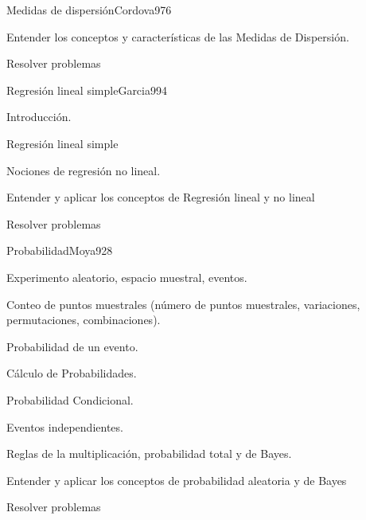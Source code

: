 \begin{sumilla}
\begin{unit}{Medidas de dispersi\'on}{Cordova97}{6}
   \begin{objetivos}
         \item  Entender los conceptos y caracter\'isticas de las Medidas de Dispersi\'on.
         \item  Resolver problemas
   \end{objetivos}
\end{unit}

\begin{unit}{Regresi\'on lineal simple}{Garcia99}{4}
   \begin{topicos}
         \item  Introducci\'on.
	 \item  Regresi\'on lineal simple
         \item  Nociones de regresi\'on no lineal.
   \end{topicos}

   \begin{objetivos}
         \item  Entender y aplicar los conceptos de Regresi\'on lineal y no lineal
         \item  Resolver problemas
   \end{objetivos}
\end{unit}

\begin{unit}{Probabilidad}{Moya92}{8}
   \begin{topicos}
         \item  Experimento aleatorio, espacio muestral, eventos.
	 \item  Conteo de puntos muestrales (n\'umero de puntos muestrales, variaciones, permutaciones, combinaciones).
         \item  Probabilidad de un evento.
	 \item  C\'alculo de Probabilidades.
	\item Probabilidad Condicional.
	\item Eventos independientes.
	\item Reglas de la multiplicaci\'on, probabilidad total y de Bayes.
   \end{topicos}

   \begin{objetivos}
         \item  Entender y aplicar los conceptos de probabilidad aleatoria y de Bayes
         \item  Resolver problemas
   \end{objetivos}
\end{unit}


\end{sumilla}
